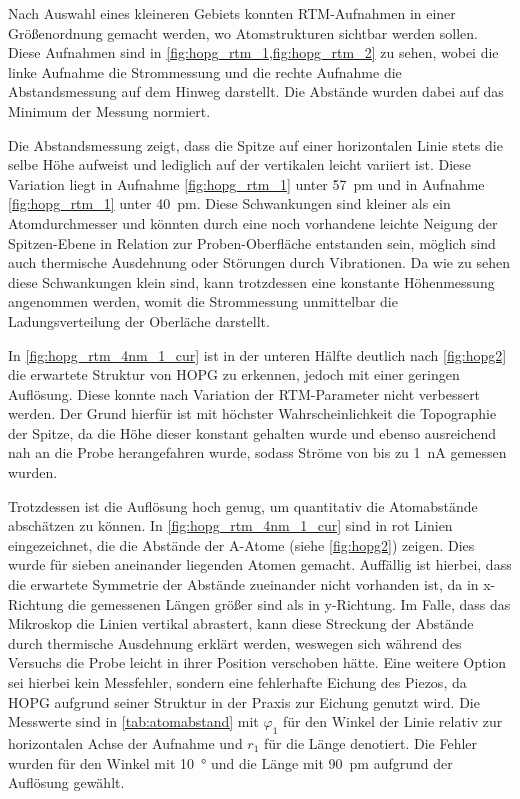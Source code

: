 Nach Auswahl eines kleineren Gebiets konnten RTM-Aufnahmen in einer Größenordnung gemacht werden, wo 
Atomstrukturen sichtbar werden sollen. Diese Aufnahmen sind in \cref{fig:hopg_rtm_1,fig:hopg_rtm_2} zu sehen, wobei 
die linke Aufnahme die Strommessung und die rechte Aufnahme die Abstandsmessung auf dem Hinweg darstellt.
Die Abstände wurden dabei auf das Minimum der Messung normiert.\par
Die Abstandsmessung zeigt, dass die 
Spitze auf einer horizontalen Linie stets die selbe Höhe aufweist und lediglich auf der vertikalen leicht variiert ist.
Diese Variation liegt in Aufnahme \ref{fig:hopg_rtm_1} unter \SI{57}{\pm} und in Aufnahme \ref{fig:hopg_rtm_1}
unter \SI{40}{\pm}. Diese Schwankungen sind kleiner als ein Atomdurchmesser und könnten durch eine noch 
vorhandene leichte Neigung der Spitzen-Ebene in Relation zur Proben-Oberfläche entstanden sein, möglich sind auch 
thermische Ausdehnung oder Störungen durch Vibrationen. Da wie zu sehen diese Schwankungen klein sind, kann 
trotzdessen eine konstante Höhenmessung angenommen werden, womit die Strommessung unmittelbar die 
Ladungsverteilung der Oberläche darstellt.




In \cref{fig:hopg_rtm_4nm_1_cur} ist in der unteren Hälfte deutlich nach \cref{fig:hopg2} die erwartete Struktur 
von HOPG zu erkennen, jedoch mit einer geringen Auflösung. Diese konnte nach Variation der 
RTM-Parameter nicht verbessert werden. Der Grund hierfür ist mit höchster Wahrscheinlichkeit die Topographie 
der Spitze, da die Höhe dieser konstant gehalten wurde und ebenso ausreichend nah an die Probe 
herangefahren wurde, sodass Ströme von bis zu \SI{1}{\nano\ampere} gemessen wurden.\par
Trotzdessen ist die Auflösung hoch genug, um quantitativ die Atomabstände abschätzen zu können.
In \cref{fig:hopg_rtm_4nm_1_cur} sind in rot Linien eingezeichnet, die die Abstände der A-Atome (siehe 
\cref{fig:hopg2}) zeigen. Dies wurde für sieben aneinander liegenden Atomen gemacht. Auffällig ist
hierbei, dass die erwartete Symmetrie der Abstände zueinander nicht vorhanden ist, da in 
x-Richtung die gemessenen Längen größer sind als in y-Richtung. Im Falle, dass das Mikroskop 
die Linien vertikal abrastert, kann diese Streckung der Abstände durch thermische Ausdehnung 
erklärt werden, weswegen sich während des Versuchs die Probe leicht in ihrer Position verschoben
hätte. Eine weitere Option sei hierbei kein Messfehler, sondern eine 
fehlerhafte Eichung des Piezos, da HOPG aufgrund seiner Struktur in der Praxis zur 
Eichung genutzt wird. Die Messwerte sind in \cref{tab:atomabstand} mit $\varphi_1$ für den Winkel der 
Linie relativ zur horizontalen Achse der Aufnahme und $r_1$ für die Länge denotiert. Die 
Fehler wurden für den Winkel mit \SI{10}{\degree} und die Länge mit \SI{90}{\pm} aufgrund 
der Auflösung gewählt.\par


